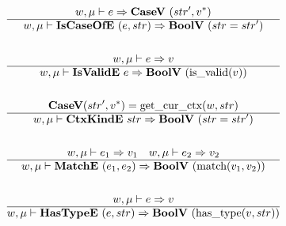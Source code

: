 \begin{gather*}
  w, \mu \vdash e \Rightarrow \casev ~ (str', \seq{v}) \\
  \hline
  w, \mu \vdash \iscaseofe ~ (e, str) \Rightarrow \boolv ~ (str = str') \\
%
\newline \\
  w, \mu \vdash e \Rightarrow v \\
  \hline
  w, \mu \vdash \isvalide ~ e \Rightarrow \boolv ~ (\isvalid(v)) \\
%
\newline \\
  \casev (str', \seq v) = \getcurctx(w, str) \\
  \hline
  w, \mu \vdash \ctxkinde ~ str \Rightarrow \boolv ~ (str = str') \\
%
\newline \\
  w, \mu \vdash e_1 \Rightarrow v_1 \quad
  w, \mu \vdash e_2 \Rightarrow v_2 \\
  \hline
  w, \mu \vdash \matche ~ (e_1, e_2) \Rightarrow \boolv ~ (\match(v_1, v_2)) \\
%
\newline \\
  w, \mu \vdash e \Rightarrow v \\
  \hline
  w, \mu \vdash \hastypee ~ (e, str) \Rightarrow \boolv ~ (\hastype(v, str)) \\
\end{gather*}






